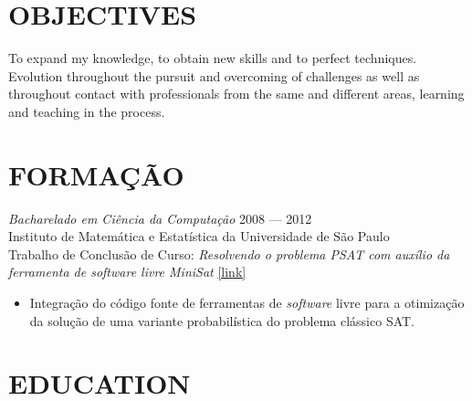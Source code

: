 \documentclass[]{res} %
\newcommand{\sbt}{\,\begin{picture}(-1,1)(-2,-3)\circle*{2}\end{picture}\ }
\def \divspace{6pt}
\def \myitemback{0.55cm}
\def \myitemsep{0pt}
\def \myprojectface{\it}
\def \myorgface{\sc}
\newif\ifport
\begin{document}
\begin{resume}

\ifport
    \section{OBJETIVOS \hspace{\divspace} }

    Expandir meu conhecimento, obter novas habilidades e aperfeiçoar técnicas. Evolução através da busca e superação de desafios assim como através do contato com profissionais da mesma e de diferentes áreas de atuação, aprendendo e ensinando no processo.
\else
    \section{OBJECTIVES \hspace{\divspace} }

    To expand my knowledge, to obtain new skills and to perfect techniques. Evolution throughout the pursuit and overcoming of challenges as well as throughout contact with professionals from the same and different areas, learning and teaching in the process.
\fi

\ifport
    \section{FORMAÇÃO \hspace{\divspace} }

    {\myprojectface Bacharelado em Ciência da Computação} \hfill 2008 — 2012 \\
    {\myorgface Instituto de Matemática e Estatística} da {\myorgface Universidade de São Paulo} \\
    Trabalho de Conclusão de Curso: {\sl Resolvendo o problema PSAT com auxílio da ferramenta de software livre MiniSat} \href{http://www.ime.usp.br/~cef/mac499-12/monografias/rec/mikail/index.html}{[link]}
    \begin{itemize}[itemsep=\myitemsep,leftmargin=\myitemback]
    \item[\sbt] Integração do código fonte de ferramentas de {\it software} livre para a otimização da solução de uma variante probabilística do problema clássico SAT.
    \end{itemize}

\else
    \section{EDUCATION \hspace{\divspace} }


\end{resume}
\end{document}
